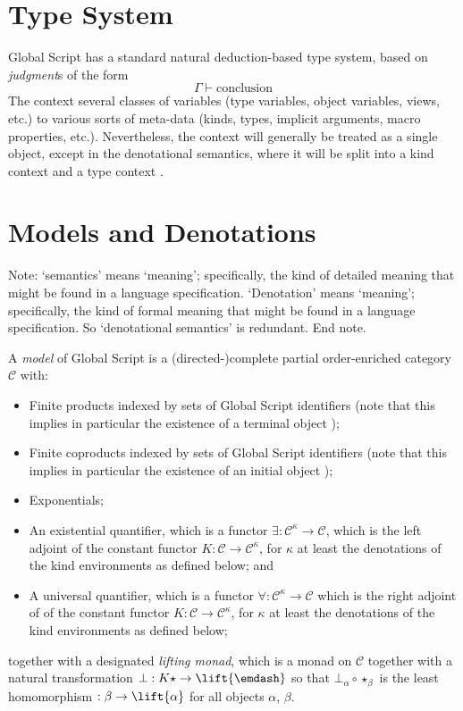 \documentclass{report}
\newcommand\sequent\vdash
\newcommand\defn[1]{\emph{#1}}
\begin{document}
\chapter{Type System}

Global Script has a standard natural deduction-based type system, based on \defn{judgment}s of the form
\begin{displaymath}
    \Gamma \sequent \text{conclusion}
\end{displaymath}
The context \<\Gamma\> several classes of variables (type variables, object variables, views, etc.) to various sorts of meta-data (kinds, types, implicit arguments, macro properties, etc.).
Nevertheless, the context will generally be treated as a single object, except in the denotational semantics,
where it will be split into a kind context \<\Delta\> and a type context \<\Gamma\>.

\chapter{Models and Denotations}

Note: `semantics' means `meaning'; specifically, the kind of detailed meaning that might be found in a language specification.
`Denotation' means `meaning'; specifically, the kind of formal meaning that might be found in a language specification.
So `denotational semantics' is redundant.
End note.

A \defn{model} of Global Script is a (directed-)complete partial order-enriched category $\mathcal{C}$ with:
\begin{itemize}
    \item Finite products indexed by sets of Global Script identifiers (note that this implies in particular the existence of a terminal object \<\star\>);
    \item Finite coproducts indexed by sets of Global Script identifiers (note that this implies in particular the existence of an initial object \<\epsilon\>);
    \item Exponentials;
    \item An existential quantifier, which is a functor $\exists : \mathcal{C}^\kappa \to \mathcal{C}$, which is the left adjoint of the constant functor $K : \mathcal{C} \to \mathcal{C}^\kappa$, for $\kappa$ at least the denotations of the kind environments as defined below; and
    \item A universal quantifier, which is a functor $\forall : \mathcal{C}^\kappa \to \mathcal{C}$ which is the right adjoint of of the constant functor $K : \mathcal{C} \to \mathcal{C}^\kappa$, for $\kappa$ at least the denotations of the kind environments as defined below;
\end{itemize}
together with a designated \defn{lifting monad}, which is a monad \<\lift{\emdash}\> on $\mathcal{C}$ together with a natural transformation $\bot : K\star \to \lift{\emdash}$ so that $\bot_\alpha \circ \star_\beta$ is the least homomorphism $: \beta \to \lift{\alpha}$ for all objects $\alpha$, $\beta$.
\end{document}
